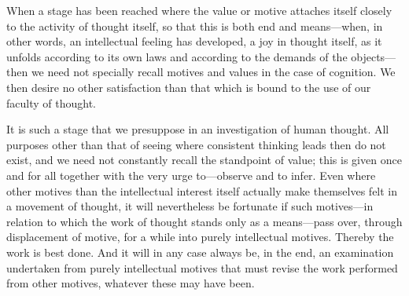\documentclass[12pt,a4paper]{book}
\newcommand{\opage}[1]{\marginnote{\footnotesize\textit{[#1]}}}
\begin{document}
\opage{22}When a stage has been reached where the value or motive attaches itself
closely to the activity of thought itself, so that this is both end and
means---when, in other words, an intellectual feeling has developed, a
joy in thought itself, as it unfolds according to its own laws and
according to the demands of the objects---then we need not specially
recall motives and values in the case of cognition. We then desire no
other satisfaction than that which is bound to the use of our faculty of
thought.

It is such a stage that we presuppose in an investigation of human
thought. All purposes other than that of seeing where consistent
thinking leads then do not exist, and we need not constantly recall the
standpoint of value; this is given once and for all together with the
very urge to---observe and to infer. Even where other motives than the
intellectual interest itself actually make themselves felt in a movement
of thought, it will nevertheless be fortunate if such motives---in
relation to which the work of thought stands only as a means---pass
over, through displacement of motive, for a while into purely
intellectual motives. Thereby the work is best done. And it will in any
case always be, in the end, an examination undertaken from purely
intellectual motives that must revise the work performed from other
motives, whatever these may have been.
\end{document}
